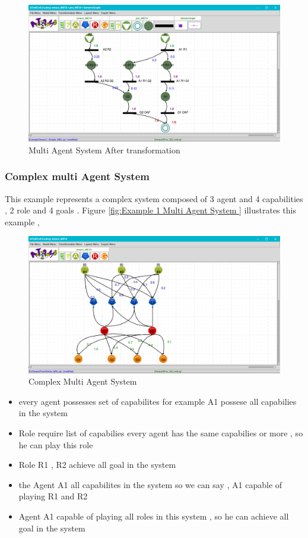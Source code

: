 \begin{figure}[th]
	\centering
 	\includegraphics[scale=0.8]{Chapiter3/img/ex1pns}
	\caption{\label{fig:Multi Agent System After transformation }Multi Agent System After transformation}
\end{figure}  
\subsubsection{ Complex multi Agent System }
This example represents a complex system composed of  3 agent and 4 capabilities , 2 role and 4 goals  . Figure \ref{fig:Example 1 Multi Agent System } illustrates this example ,
 


\begin{figure}[th]
	\centering
 	\includegraphics[scale=0.8]{Chapiter3/img/article}
	\caption{\label{fig:Complex Multi Agent System}Complex Multi Agent System}
\end{figure} 

\begin{itemize}
	\item every agent possesses set of capabilites for example A1 possese all capabilies in the system
	\item Role require list of capabilies every agent has the same capabilies or more , so he can play this role
	\item Role R1 , R2 achieve all goal in the system
	\item the Agent A1 all capabilites in the system so we can say , A1 capable of playing R1 and R2
	\item Agent A1 capable of playing all roles in this system , so he can achieve all goal in the system
\end{itemize}

